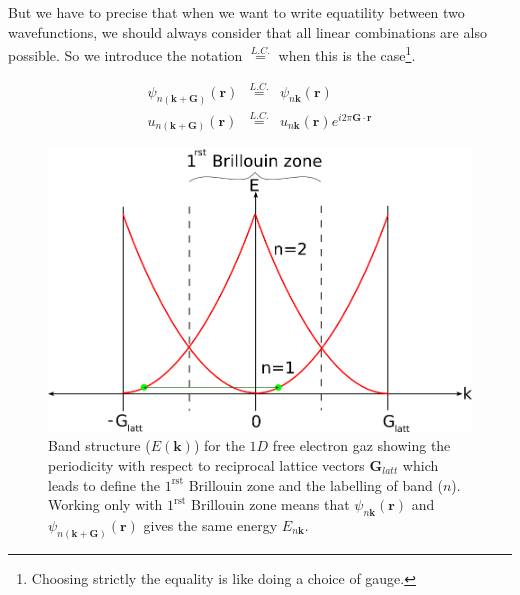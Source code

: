 \documentclass[a4paper,12pt]{report}
\begin{document}
But we have to precise that when we want to write equatility between two wavefunctions, we should always consider that all linear combinations are also possible. So we introduce the notation $\stackrel{L.C.}{=}$ when this is the case\footnote{Choosing strictly the equality is like doing a choice of gauge.}.

\begin{eqnarray}
\psi_{n(\mathbf{k}+\mathbf{G})}(\mathbf{r}) &\stackrel{L.C.}{=}& \psi_{n\mathbf{k}}(\mathbf{r}) \\
u_{n(\mathbf{k}+\mathbf{G})}(\mathbf{r}) &\stackrel{L.C.}{=}& u_{n\mathbf{k}}(\mathbf{r}) e^{i2\pi \mathbf{G}\cdotp\mathbf{r}}
\end{eqnarray}

\begin{figure}[!h]
\centering
\begin{minipage}[c]{0.69\textwidth}
\includegraphics[width = \textwidth]{1rstBZ_free_electron}
\end{minipage}
\vspace{0.05\textwidth}
\begin{minipage}[c]{1.0\textwidth}
\caption{\small Band structure ($E(\mathbf{k})$) for the $1D$ free electron gaz showing the periodicity with respect to reciprocal lattice vectors $\mathbf{G}_{latt}$ which leads to define the $1^{\text{rst}}$ Brillouin zone and the labelling of band ($n$). Working only with $1^{\text{rst}}$ Brillouin zone means that $\psi_{n\mathbf{k}} (\mathbf{r})$ and $\psi_{n(\mathbf{k}+\mathbf{G})}(\mathbf{r})$ gives the same energy $E_{n\mathbf{k}}$.}
\label{figband_1rstBZ}
\end{minipage}
\end{figure}
\end{document}
